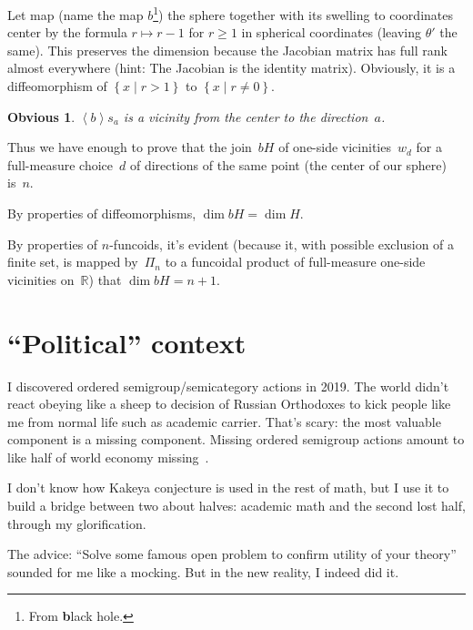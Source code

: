 \documentclass[oneside,draft]{amsart}
\newcommand{\setcond}[2]{\left\{#1\mid#2\right\}}
\newcommand{\supfun}[1]{\left\langle#1\right\rangle}
\newtheorem{obvious}{Obvious}
\begin{document}
Let map (name the map $b$\footnote{From \textbf{b}lack hole.}) the sphere together with its swelling to coordinates center by the formula $r\mapsto r-1$ for $r\geq 1$ in spherical coordinates (leaving $\theta'$ the same).
This preserves the dimension because the Jacobian matrix has full rank almost everywhere (hint: The Jacobian is the identity matrix).
Obviously, it is a diffeomorphism of $\setcond{x}{r>1}$ to $\setcond{x}{r\ne 0}$.

\begin{obvious}
$\supfun{b}s_a$ is a vicinity from the center to the direction~$a$.
\end{obvious}

Thus we have enough to prove that the join~$bH$ of one-si\-de vicinities~$w_d$ for a full-me\-a\-su\-re choice~$d$ of directions of the same point (the center of our sphere) is~$n$.

By properties of diffeomorphisms, $\dim bH = \dim H$.

By properties of $n$-fun\-co\-ids, it's evident (because it, with possible exclusion of a finite set, is mapped by~$\Pi_n$ to a funcoidal product of full-measure one-si\-de vicinities on~$\mathbb{R}$) that $\dim bH=n+1$.

\section{``Political'' context}

I discovered ordered semigroup/semicategory actions in 2019. The world didn't react obeying like a sheep to decision of Russian Orthodoxes to kick people like me from normal life such as academic carrier. That's scary: the most valuable component is a missing component. Missing ordered semigroup actions amount to like half of world economy missing~\cite{osa-important}.

I don't know how Kakeya conjecture is used in the rest of math, but I use it to build a bridge between two about halves: academic math and the second lost half, through my glorification.

The advice: ``Solve some famous open problem to confirm utility of your theory'' sounded for me like a mocking. But in the new reality, I indeed did it.



\end{document}
